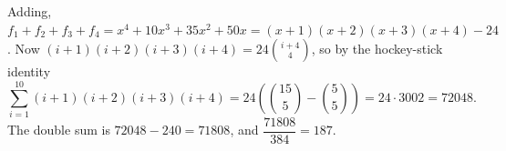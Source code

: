 Adding, $f_1+f_2+f_3+f_4=x^4+10x^3+35x^2+50x=(x+1)(x+2)(x+3)(x+4)-24$. Now $(i+1)(i+2)(i+3)(i+4)=24\binom{i+4}{4}$, so by the hockey-stick identity
\[\sum_{i=1}^{10}(i+1)(i+2)(i+3)(i+4)=24\left(\binom{15}{5}-\binom55\right)=24\cdot3002=72048.\]
The double sum is $72048-240=71808$, and $\dfrac{71808}{384}=\boxed{187}$.

